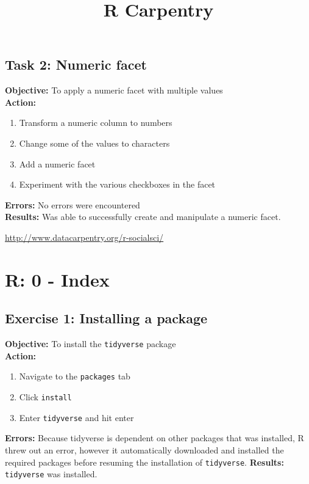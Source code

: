 \documentclass{article}
\begin{document}
\subsection{Task 2: Numeric facet}
\textbf{Objective:} To apply a numeric facet with multiple values\\
\textbf{Action:}
\begin{enumerate}
    \item Transform a numeric column to numbers
    \item Change some of the values to characters
    \item Add a numeric facet
    \item Experiment with the various checkboxes in the facet
\end{enumerate}
\textbf{Errors: }No errors were encountered\\
\textbf{Results:} Was able to successfully create and manipulate a numeric facet.
\newpage
\title{R Carpentry}
\maketitle
\begin{center}
    \url{http://www.datacarpentry.org/r-socialsci/}
\end{center}
\newpage
\section{R: 0 - Index}
\subsection{Exercise 1: Installing a package}
\textbf{Objective:} To install the \texttt{tidyverse} package\\
\textbf{Action:}
\begin{enumerate}
    \item Navigate to the \texttt{packages} tab
    \item Click \texttt{install}
    \item Enter \texttt{tidyverse} and hit enter
\end{enumerate}
\textbf{Errors:} Because tidyverse is dependent on other packages that was installed, R threw out an error, however it automatically downloaded and installed the required packages before resuming the installation of \texttt{tidyverse}.
\textbf{Results:} \texttt{tidyverse} was installed.

\end{document}

